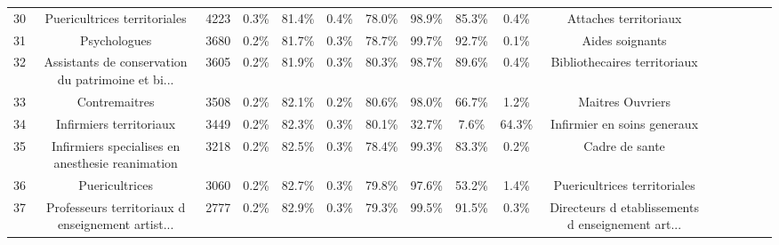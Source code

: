 \documentclass[10pt]{article}
\begin{document}
\begin{landscape}
\begin{longtable}{ | p{0.5cm} |*{15}{c|} }
30  &                       Puericultrices territoriales &           4223 &           0.3\% &                  81.4\% &                 0.4\% &                    78.0\% &              98.9\% &                             85.3\% &                                     0.4\% &                              Attaches territoriaux \\
31  &                                       Psychologues &           3680 &           0.2\% &                  81.7\% &                 0.3\% &                    78.7\% &              99.7\% &                             92.7\% &                                     0.1\% &                                    Aides soignants \\
32  &  Assistants de conservation du patrimoine et bi... &           3605 &           0.2\% &                  81.9\% &                 0.3\% &                    80.3\% &              98.7\% &                             89.6\% &                                     0.4\% &                       Bibliothecaires territoriaux \\
33  &                                      Contremaitres &           3508 &           0.2\% &                  82.1\% &                 0.2\% &                    80.6\% &              98.0\% &                             66.7\% &                                     1.2\% &                                   Maitres Ouvriers \\
34  &                            Infirmiers territoriaux &           3449 &           0.2\% &                  82.3\% &                 0.3\% &                    80.1\% &              32.7\% &                              7.6\% &                                    64.3\% &                        Infirmier en soins generaux \\
35  &   Infirmiers specialises en anesthesie reanimation &           3218 &           0.2\% &                  82.5\% &                 0.3\% &                    78.4\% &              99.3\% &                             83.3\% &                                     0.2\% &                                     Cadre de sante \\
36  &                                     Puericultrices &           3060 &           0.2\% &                  82.7\% &                 0.3\% &                    79.8\% &              97.6\% &                             53.2\% &                                     1.4\% &                       Puericultrices territoriales \\
37  &  Professeurs territoriaux d enseignement artist... &           2777 &           0.2\% &                  82.9\% &                 0.3\% &                    79.3\% &              99.5\% &                             91.5\% &                                     0.3\% &  Directeurs d etablissements d enseignement art... \\

\end{longtable}
\end{landscape}
\end{document}
